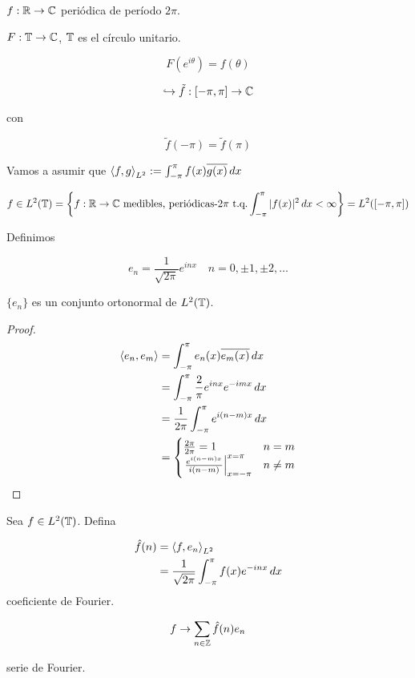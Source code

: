 $f:\mathbb{R}\to\mathbb{C}$ periódica de período $2\pi$.

$F:\mathbb{T}\to\mathbb{C}$, $\mathbb{T}$ es el círculo unitario.

\[F(e^{i\theta})=f(\theta)\]

\[\hookrightarrow \tilde f:[-\pi,\pi]\to\mathbb{C}\]

con

\[\tilde f(-\pi)=\tilde f(\pi)\]

Vamos a asumir que $\left\langle f,g\right\rangle_{L^2}:=\int_{-\pi}^\pi f(x)\overline{g(x)}\,dx$

\[f\in L^2(\mathbb{T})=\left\{f:\mathbb{R}\to\mathbb{C}\text{ medibles, periódicas-$2\pi$ t.q.} \int_{-\pi}^\pi |f(x)|^2\,dx<\infty\right\}=L^2([-\pi,\pi])\]

Definimos 

\[e_n=\frac{1}{\sqrt{2\pi}}e^{inx}\quad n=0,\pm 1,\pm 2,\ldots\]

\begin{fproposition}
    $\{e_n\}$ es un conjunto ortonormal de $L^2(\mathbb{T})$.
\end{fproposition}

\begin{proof}
    \begin{align*}
        \left\langle e_n,e_m\right\rangle&=\int_{-\pi}^\pi e_n(x)\overline{e_m(x)}\,dx\\
        &=\int_{-\pi}^\pi \frac{2}{\pi} e^{inx}e^{-imx}\,dx\\
        &=\frac{1}{2\pi}\int_{-\pi}^\pi e^{i(n-m)x}\,dx\\
        &=\begin{cases}
            \frac{2\pi}{2\pi}=1&n=m\\
            \left.\frac{e^{i(n-m)x}}{i(n-m)}\right|_{x=-\pi}^{x=\pi}&n\neq m
        \end{cases}
    \end{align*}
\end{proof}

\begin{fdefinition}
    Sea $f\in L^2(\mathbb{T})$. Defina 
    
    \begin{align*}
        \hat f (n)&=\left\langle f,e_n\right\rangle_{L^2}\\
        &=\frac{1}{\sqrt{2\pi}}\int_{-\pi}^\pi f(x) e^{-inx}\,dx
    \end{align*}
    coeficiente de Fourier.

    \[f\to \sum_{n\in\mathbb{Z}}\hat f(n)e_n\]

    serie de Fourier.
\end{fdefinition}

